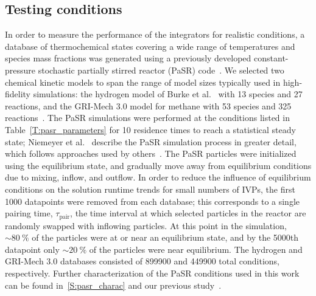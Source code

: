 \documentclass[preprint,review,11pt]{elsarticle}
\begin{document}
\subsection{Testing conditions}
\label{S:pasr_conditions}

In order to measure the performance of the integrators for realistic conditions, a database of thermochemical states covering a wide range of temperatures and species mass fractions was generated using a previously developed constant-pressure stochastic partially stirred reactor (PaSR) code~\cite{Niemeyer:2016aa,niemeyer_2016_51139}.
We selected two chemical kinetic models to span the range of model sizes typically used in high-fidelity simulations: the hydrogen model of Burke et al.~\cite{Burke:2011fh} with 13 species and 27 reactions, and the GRI-Mech 3.0 model for methane with 53 species and 325 reactions~\cite{smith_gri-mech_30}.
The PaSR simulations were performed at the conditions listed in Table~\ref{T:pasr_parameters} for 10 residence times to reach a statistical steady state; Niemeyer et al.~\cite{Niemeyer:2016aa} describe the PaSR simulation process in greater detail, which follows approaches used by others~\cite{Chen:1997ta,Pope:1997wu,Ren:2014cd}.
The PaSR particles were initialized using the equilibrium state, and gradually move away from equilibrium conditions due to mixing, inflow, and outflow.
In order to reduce the influence of equilibrium conditions on the solution runtime trends for small numbers of IVPs, the first \num{1000} datapoints were removed from each database; this corresponds to a single pairing time, $\tau_\text{pair}$, the time interval at which selected particles in the reactor are randomly swapped with inflowing particles.
At this point in the simulation, $\sim\SI{80}{\percent}$ of the particles were at or near an equilibrium state, and by the \num{5000}th datapoint only $\sim\SI{20}{\percent}$ of the particles were near equilibrium.
The hydrogen and GRI-Mech 3.0 databases consisted of \num{899900} and \num{449900} total conditions, respectively.
Further characterization of the PaSR conditions used in this work can be found in~\ref{S:pasr_charac} and our previous study~\cite{Niemeyer:2016aa}.
\end{document}
